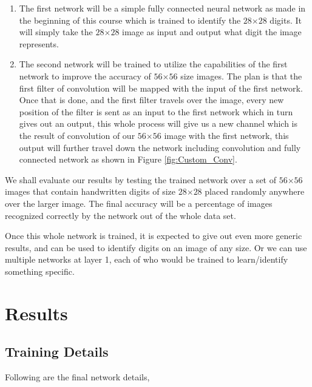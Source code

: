 \documentclass[12pt]{acmart}
\begin{document}
\begin{enumerate}
    \item The first network will be a simple fully connected neural network as made in the beginning of this course which is trained to identify the $28$$\times$$28$ digits. It will simply take the $28$$\times$$28$ image as input and output what digit the image represents.
    \item The second network will be trained to utilize the capabilities of the first network to improve the accuracy of $56$$\times$$56$ size images. The plan is that the first filter of convolution will be mapped with the input of the first network. Once that is done, and the first filter travels over the image, every new position of the filter is sent as an input to the first network which in turn gives out an output, this whole process will give us a new channel which is the result of convolution of our $56$$\times$$56$ image with the first network, this output will further travel down the network including convolution and fully connected network as shown in Figure \ref{fig:Custom_Conv}.
\end{enumerate}

We shall evaluate our results by testing the trained network over a set of $56$$\times$$56$ images that contain handwritten digits of size $28$$\times$$28$ placed randomly anywhere over the larger image. The final accuracy will be a percentage of images recognized correctly by the network out of the whole data set.



Once this whole network is trained, it is expected to give out even more generic results, and can be used to identify digits on an image of any size. Or we can use multiple networks at layer 1, each of who would be trained to learn/identify something specific.

\section{Results}
\subsection{Training Details}

Following are the final network details,
\end{document}
